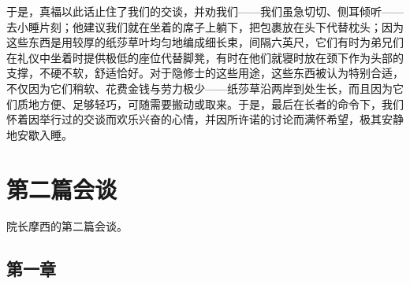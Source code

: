 于是，真福以此话止住了我们的交谈，并劝我们——我们虽急切切、侧耳倾听——去小睡片刻；他建议我们就在坐着的席子上躺下，把包裹放在头下代替枕头；因为这些东西是用较厚的纸莎草叶均匀地编成细长束，间隔六英尺，它们有时为弟兄们在礼仪中坐着时提供极低的座位代替脚凳，有时在他们就寝时放在颈下作为头部的支撑，不硬不软，舒适恰好。对于隐修士的这些用途，这些东西被认为特别合适，不仅因为它们稍软、花费金钱与劳力极少——纸莎草沿两岸到处生长，而且因为它们质地方便、足够轻巧，可随需要搬动或取来。于是，最后在长者的命令下，我们怀着因举行过的交谈而欢乐兴奋的心情，并因所许诺的讨论而满怀希望，极其安静地安歇入睡。\par



\section{第二篇会谈}

\par

院长摩西的第二篇会谈。\par


\subsection{第一章}

\par

